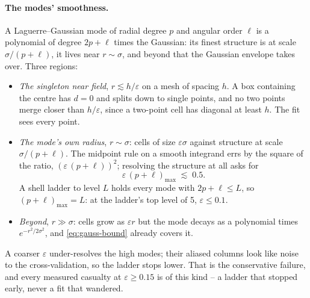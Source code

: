 \documentclass[11pt]{article}
\newcommand{\eps}{\varepsilon}
\begin{document}
\paragraph{The modes' smoothness.} A Laguerre--Gaussian mode of radial
degree $p$ and angular order $\ell$ is a polynomial of degree $2p + \ell$
times the Gaussian: its finest structure is at scale $\sigma/(p + \ell)$, it
lives near $r \sim \sigma$, and beyond that the Gaussian envelope takes over.
Three regions:
\begin{itemize}
\item \emph{The singleton near field}, $r \lesssim h/\eps$ on a mesh of
  spacing $h$. A box containing the centre has $d = 0$ and splits down to
  single points, and no two points merge closer than $h/\eps$, since a
  two-point cell has diagonal at least $h$. The fit sees every point.
\item \emph{The mode's own radius}, $r \sim \sigma$: cells of size
  $\eps\sigma$ against structure at scale $\sigma/(p + \ell)$. The midpoint
  rule on a smooth integrand errs by the square of the ratio, $(\eps\,(p +
  \ell))^2$; resolving the structure at all asks for
  \begin{equation}
  \eps\,(p + \ell)_{\max} \;\lesssim\; 0.5 .
  \label{eq:resolution}
  \end{equation}
  A shell ladder to level $L$ holds every mode with $2p + \ell \le L$, so
  $(p + \ell)_{\max} = L$: at the ladder's top level of 5, $\eps \le 0.1$.
\item \emph{Beyond}, $r \gg \sigma$: cells grow as $\eps r$ but the mode
  decays as a polynomial times $e^{-r^2/2\sigma^2}$, and
  \eqref{eq:gauss-bound} already covers it.
\end{itemize}
A coarser $\eps$ under-resolves the high modes; their aliased columns look
like noise to the cross-validation, so the ladder stops lower. That is the
conservative failure, and every measured casualty at $\eps \ge 0.15$ is of
this kind -- a ladder that stopped early, never a fit that wandered.
\end{document}
